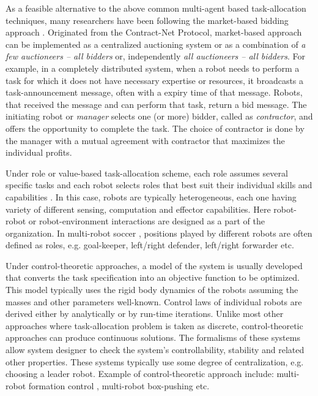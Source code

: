 \documentclass[final,5p,times,twocolumn]{elsarticle}
\begin{document}
As a feasible alternative to the above common multi-agent based task-allocation techniques, many researchers have been following the market-based bidding approach \citet{Dias+2006}. Originated from the Contract-Net Protocol, market-based approach can be implemented as a centralized auctioning system or as a combination of {\em a few auctioneers -- all bidders} or, independently {\em all auctioneers -- all bidders}. For example, in a completely distributed system, when a robot needs to perform a task for which it does not have necessary expertise or resources, it broadcasts a task-announcement message, often with  a expiry time of that message. Robots, that received the message and can perform that task, return a bid message. The initiating robot or {\em  manager} selects one (or more) bidder, called as {\em contractor}, and offers the opportunity to complete the task. The choice of contractor is done by the manager with a mutual agreement with contractor that maximizes the individual profits.

Under role or value-based task-allocation scheme, each role assumes several specific tasks and each robot selects roles that best suit their individual skills and capabilities \cite{Chaimowicz2002}. In this case, robots are typically heterogeneous, each one having variety of different sensing, computation and effector capabilities. Here robot-robot or robot-environment interactions are designed as a part of the organization. In multi-robot soccer \cite{Stone+1999}, positions played by different  robots are often defined as roles, e.g. goal-keeper, left/right defender, left/right forwarder etc. 

Under control-theoretic approaches, a model of the system is usually developed that converts the task specification into an objective function to be optimized. This model typically  uses  the rigid  body dynamics of the robots assuming the masses and other parameters well-known. Control laws of individual robots are derived either by analytically or by run-time iterations. Unlike most other approaches where task-allocation problem is taken as discrete, control-theoretic approaches can produce continuous  solutions. The formalisms of these systems allow system designer to check the system's controllability, stability and related other properties.  These systems typically use some degree of centralization, e.g. choosing a leader robot.  Example of control-theoretic approach include: multi-robot formation control \cite{Belta+2004}, multi-robot box-pushing \cite{Pereira+2003}  etc.
\end{document}
